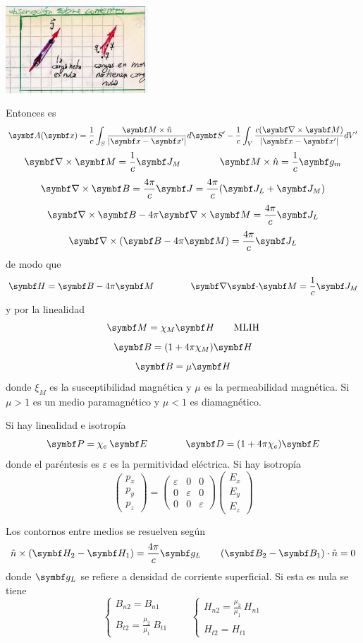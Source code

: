 \documentclass[10pt,oneside]{CBFT_book}
\begin{document}
\includegraphics[width=0.4\textwidth]{images/fig_ft1_imaninducidos_nota.jpg}

Entonces es
\[
	\vb{A}( \vb{x}) = \frac{1}{c} \int_S 
	\frac{ \vb{M}\times\hat{n} }{|\vb{x}-\vb{x}'|} d\vb{S}' - 
	\frac{1}{c} \int_V \frac{ c(\rotorm{M}) }{|\vb{x}-\vb{x}'|}  dV'
\]
\[
	\rotorm{M} = \frac{1}{c}\vb{J}_M \qquad \qquad \vb{M}\times\hat{n} = \frac{1}{c}\vb{g}_m
\]
\[
	\rotorm{B} = \frac{4\pi}{c}\vb{J}  = \frac{4\pi}{c}( \vb{J}_L + \vb{J}_M )
\]
\[
	\rotorm{B} - 4\pi \rotorm{M} = \frac{4\pi}{c}\vb{J}_L
\]
\[
	\Nabla\times( \vb{B} - 4\pi\vb{M} ) = \frac{4\pi}{c}\vb{J}_L 
\]
de modo que
\[
	\vb{H} = \vb{B} - 4 \pi \vb{M} \qquad \qquad \divem{M} = \frac{1}{c}\vb{J}_M  
\]
y por la linealidad
\[
	\vb{M} = \chi_M \vb{H} \qquad \text{MLIH}
\]
\[
	\vb{B} = ( 1 + 4\pi\chi_M ) \vb{H} 
\]
\[
	\vb{B} = \mu \vb{H}
\]
donde $\xi_M$ es la susceptibilidad magnética y $\mu$ es la permeabilidad magnética.
Si $\mu > 1 $ es un medio paramagnético y $\mu < 1$ es diamagnético.


Si hay linealidad e isotropía
\[
	\vb{P} = \chi_e \: \vb{E} \qquad \qquad \vb{D} = ( 1 + 4 \pi \chi_e ) \vb{E}
\]
donde el paréntesis es $\varepsilon$ es la permitividad eléctrica.
Si hay isotropía
\[
	\begin{pmatrix}
		p_x \\
		p_y \\
		p_z
	\end{pmatrix} 
	=
	\begin{pmatrix}
		\varepsilon & 0 & 0 \\
		0 & \varepsilon & 0 \\
		0 & 0 & \varepsilon
	\end{pmatrix} 
	\begin{pmatrix}
		E_x \\
		E_y \\
		E_z
	\end{pmatrix} 
\]


Los contornos entre medios se resuelven según
\[
	\hat{n} \times (\vb{H}_2 -\vb{H}_1) = \frac{4 \pi}{c} \vb{g}_L \qquad 
	(\vb{B}_2 -\vb{B}_1)\cdot\hat{n} = 0 
\]
donde $\vb{g}_L$ se refiere a densidad de corriente superficial.
Si esta es nula se tiene
\[
	\begin{cases}
	B_{n2} = B_{n1} \\
	\\
	\displaystyle B_{t2} = \frac{\mu_2}{\mu_1}\: B_{t1}
	\end{cases}
	\qquad 
	\begin{cases}
	\displaystyle H_{n2} = \frac{\mu_2}{\mu_1}\: H_{n1} \\
	\\
	H_{t2} = H_{t1} 
	\end{cases}
\]
\end{document}

